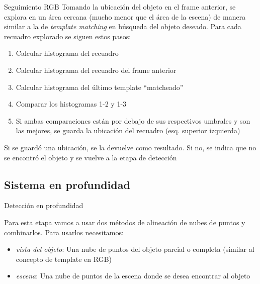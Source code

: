 \documentclass[]{beamer}
\begin{document}
\begin{frame}[t]{Seguimiento RGB}
    Tomando la ubicación del objeto en el frame anterior, se explora en un área cercana (mucho menor que el área de la escena) de manera similar a la de \textit{template matching} en búsqueda del objeto deseado. Para cada recuadro explorado se siguen estos pasos:
    \begin{enumerate}
        \item Calcular histograma del recuadro
        \item Calcular histograma del recuadro del frame anterior
        \item Calcular histograma del último template ``matcheado''
        \item Comparar los histogramas 1-2 y 1-3
        \item Si ambas comparaciones están por debajo de sus respectivos umbrales y son las mejores, se guarda la ubicación del recuadro (esq. superior izquierda)
    \end{enumerate}
    Si se guardó una ubicación, se la devuelve como resultado. Si no, se indica que no se encontró el objeto y se vuelve a la etapa de detección
\end{frame}



\subsection{Sistema en profundidad}
\begin{frame}[t]{Detección en profundidad}

    Para esta etapa vamos a usar dos métodos de alineación de nubes de puntos y combinarlos. Para usarlos necesitamos:
    \begin{itemize}
        \item \textit{vista del objeto}: Una nube de puntos del objeto parcial o completa (similar al concepto de template en RGB)
        \item \textit{escena}: Una nube de puntos de la escena donde se desea encontrar al objeto
    \end{itemize}
\end{frame}
\end{document}
